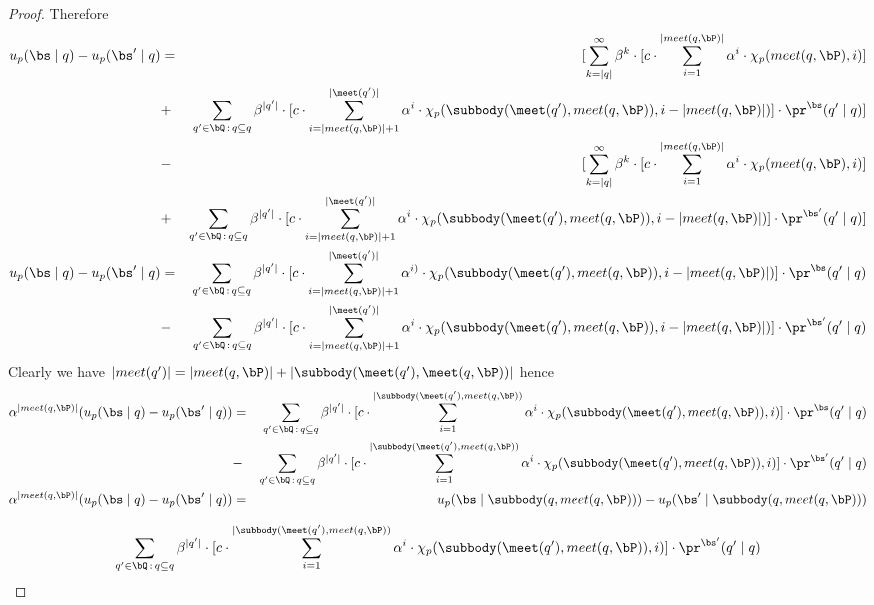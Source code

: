 \begin{proof}
	Therefore
	\begin{eqnarray*}
		u_p(\bs \mid q) - u_p(\bs' \mid q) & = & [\sum_{k = |q|}^{\infty} \beta^{k} \cdot  [{\displaystyle c \cdot \sum_{i=1}^{|meet(q,\bP)|} \alpha^i \cdot \chi_p(meet(q,\bP),i) }] \\
		&+ & \sum_{q' \in \bQ \,:\, q \subseteq q} \beta^{|q'|} \cdot  [{\displaystyle c \cdot \sum_{i=|meet(q,\bP)|+1}^{|\meet(q')|} \alpha^{i} \cdot \chi_p(\subbody(\meet(q'),meet(q,\bP)),i-|meet(q,\bP)|)  }] \cdot \pr^{\bs}(q' \mid q) ]\\ 
		&- &[\sum_{k = |q|}^{\infty} \beta^{k} \cdot  [{\displaystyle c \cdot \sum_{i=1}^{|meet(q,\bP)|} \alpha^i \cdot \chi_p(meet(q,\bP),i) }] \\
		&+ & \sum_{q' \in \bQ \,:\, q \subseteq q} \beta^{|q'|} \cdot  [{\displaystyle c \cdot \sum_{i=|meet(q,\bP)|+1}^{|\meet(q')|} \alpha^{i} \cdot \chi_p(\subbody(\meet(q'),meet(q,\bP)),i-|meet(q,\bP)|)  }] \cdot \pr^{\bs'}(q' \mid q) ]\\ 
		u_p(\bs \mid q) - u_p(\bs' \mid q) & = & \sum_{q' \in \bQ \,:\, q \subseteq q} \beta^{|q'|} \cdot  [{\displaystyle c \cdot \sum_{i=|meet(q,\bP)|+1}^{|\meet(q')|} \alpha^{i)} \cdot \chi_p(\subbody(\meet(q'),meet(q,\bP)),i-|meet(q,\bP)|)  }] \cdot \pr^{\bs}(q' \mid q) \\ 
		& - & \sum_{q' \in \bQ \,:\, q \subseteq q} \beta^{|q'|} \cdot  [{\displaystyle c \cdot \sum_{i=|meet(q,\bP)|+1}^{|\meet(q')|} \alpha^{i} \cdot \chi_p(\subbody(\meet(q'),meet(q,\bP)),i-|meet(q,\bP)|)  }] \cdot \pr^{\bs'}(q' \mid q) \\
	\end{eqnarray*}
	Clearly we have $|meet(q')| = |meet(q,\bP)| + |\subbody(\meet(q'),\meet(q,\bP))| $ hence 
	\begin{eqnarray*}
		\alpha^{|meet(q,\bP)|} (u_p(\bs \mid q) - u_p(\bs' \mid q)) & = & \sum_{q' \in \bQ \,:\, q \subseteq q} \beta^{|q'|} \cdot  [{\displaystyle c \cdot \sum_{i=1}^{|\subbody(\meet(q'),meet(q,\bP))} \alpha^{i} \cdot \chi_p(\subbody(\meet(q'),meet(q,\bP)),i)  }] \cdot \pr^{\bs}(q' \mid q) \\ 
		& - & \sum_{q' \in \bQ \,:\, q \subseteq q} \beta^{|q'|} \cdot  [{\displaystyle c \cdot \sum_{i=1}^{|\subbody(\meet(q'),meet(q,\bP))} \alpha^{i} \cdot \chi_p(\subbody(\meet(q'),meet(q,\bP)),i)  }] \cdot \pr^{\bs'}(q' \mid q) \\
		\alpha^{|meet(q,\bP)|} (u_p(\bs \mid q) - u_p(\bs' \mid q)) & = & u_p(\bs \mid \subbody(q,meet(q,\bP))) - u_p(\bs' \mid \subbody(q,meet(q,\bP))) \\
	\end{eqnarray*}

$$ \sum_{q' \in \bQ \,:\, q \subseteq q} \beta^{|q'|} \cdot  [{\displaystyle c \cdot \sum_{i=1}^{|\subbody(\meet(q'),meet(q,\bP))} \alpha^{i} \cdot \chi_p(\subbody(\meet(q'),meet(q,\bP)),i)  }] \cdot \pr^{\bs'}(q' \mid q) \\$$
\end{proof}


